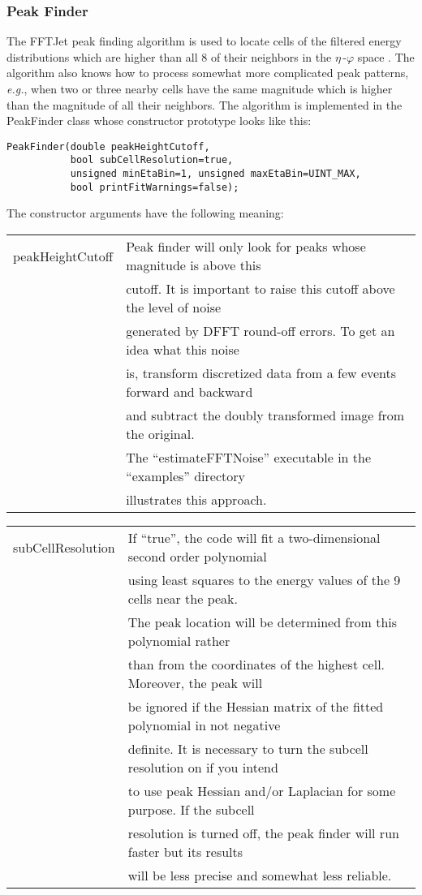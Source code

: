 \documentclass[epsf,12pt,titlepage]{article}
\def\epspace {$\eta$\,-$\varphi$ space }
\newcommand{\cname}[1]{\index{#1}\textsf{#1}}
\begin{document}
\subsubsection{Peak Finder}

The FFTJet peak finding algorithm is used to locate cells of the filtered
energy distributions which are higher than all 8 of their neighbors
in the \epspace\!\!.
The algorithm also knows how to process somewhat more complicated
peak patterns, {\it e.g.}, when two or three nearby cells have the
same magnitude which is higher than the magnitude of all their neighbors.
The algorithm is implemented in the \cname{PeakFinder} class whose
constructor prototype looks like this:
\begin{verbatim}
PeakFinder(double peakHeightCutoff,
           bool subCellResolution=true,
           unsigned minEtaBin=1, unsigned maxEtaBin=UINT_MAX,
           bool printFitWarnings=false);
\end{verbatim}
The constructor arguments have the
following meaning:
\vskip2mm

\noindent \begin{tabular}{ll}
peakHeightCutoff & Peak finder will only look for peaks whose magnitude is above this\\
& cutoff. It is important to raise this cutoff above the level of noise\\
& generated by DFFT round-off errors. To get an idea what this noise\\
& is, transform discretized data from a few events forward and backward\\
& and subtract the doubly transformed image from the original.\\
& The ``estimateFFTNoise'' executable in the ``examples'' directory\\
& illustrates this approach.
\end{tabular}

\noindent \begin{tabular}{ll}
subCellResolution & If ``true'', the code will fit a two-dimensional second order polynomial\\
& using least squares to the energy values of the 9 cells near the peak.\\
& The peak location will be determined from this polynomial rather\\
& than from the coordinates of the highest cell. Moreover, the peak will\\
&  be ignored if the Hessian matrix of the fitted polynomial in not negative\\
& definite. It is necessary to turn the subcell resolution on if you intend\\
& to use peak Hessian and/or Laplacian for some purpose. If the subcell\\
& resolution is turned off, the peak finder will run faster but its results\\
& will be less precise and somewhat less reliable.
\end{tabular}
\end{document}
